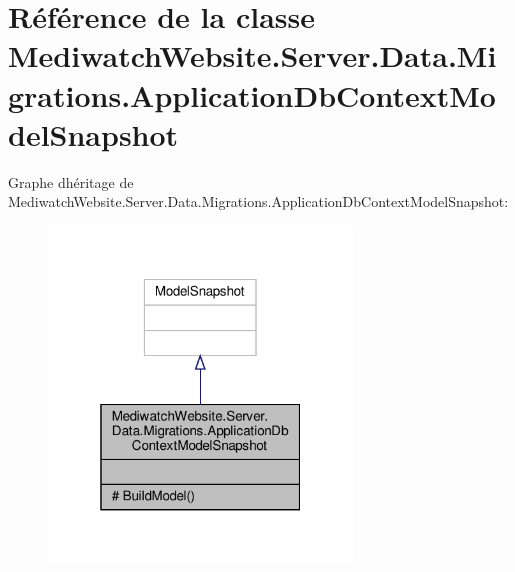 \hypertarget{class_mediwatch_website_1_1_server_1_1_data_1_1_migrations_1_1_application_db_context_model_snapshot}{}\section{Référence de la classe Mediwatch\+Website.\+Server.\+Data.\+Migrations.\+Application\+Db\+Context\+Model\+Snapshot}
\label{class_mediwatch_website_1_1_server_1_1_data_1_1_migrations_1_1_application_db_context_model_snapshot}


Graphe d\textquotesingle{}héritage de Mediwatch\+Website.\+Server.\+Data.\+Migrations.\+Application\+Db\+Context\+Model\+Snapshot\+:
\nopagebreak
\begin{figure}[H]
\begin{center}
\leavevmode
\includegraphics[width=229pt]{class_mediwatch_website_1_1_server_1_1_data_1_1_migrations_1_1_application_db_context_model_snapshot__inherit__graph}
\end{center}
\end{figure}


